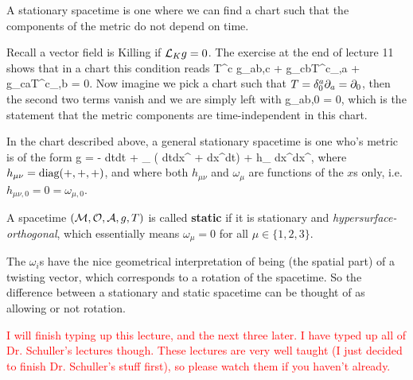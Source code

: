 \bcl 
    A stationary spacetime is one where we can find a chart such that the components of the metric do not depend on time. 
\ecl 

\bq 
    Recall a vector field is Killing if $\mathcal{L}_Kg=0$. The exercise at the end of lecture 11 shows that in a chart this condition reads 
    \bse 
        T^{c} g_{ab,c} + g_{cb}{T^c}_{,a} + g_{ca}{T^c}_{,b} = 0.
    \ese 
    Now imagine we pick a chart such that $T = \delta^{a}_0 \partial_{a} = \partial_0$, then the second two terms vanish and we are simply left with
    \bse 
        g_{ab,0} = 0,
    \ese
    which is the statement that the metric components are time-independent in this chart.
\eq 

In the chart described above, a general stationary spacetime is one who's metric is of the form
\bse 
    g = - dt\otimes dt + \omega_{\mu} \big( dt\otimes dx^{\mu} + dx^{\mu}\otimes dt\big) + h_{\mu\nu} dx^{\mu}\otimes dx^{\nu},
\ese
where $h_{\mu\nu}=\text{diag}(+,+,+)$, and where both $h_{\mu\nu}$ and $\omega_{\mu}$ are functions of the $x$s only, i.e. $h_{\mu\nu,0} = 0 = \omega_{\mu,0}$. 

    A spacetime $(\mathcal{M},\mathcal{O},\mathcal{A},g,T)$ is called \textbf{static} if it is stationary and \textit{hypersurface-orthogonal}, which essentially means $\omega_{\mu} = 0$ for all $\mu\in\{1,2,3\}$. 
\ed 

\br 
    The $\omega_i$s have the nice geometrical interpretation of being (the spatial part) of a twisting vector, which corresponds to a rotation of the spacetime. So the difference between a stationary and static spacetime can be thought of as allowing or not rotation.
\er 

\textcolor{red}{I will finish typing up this lecture, and the next three later. I have typed up all of Dr. Schuller's lectures though. These lectures are very well taught (I just decided to finish Dr. Schuller's stuff first), so please watch them if you haven't already.}

